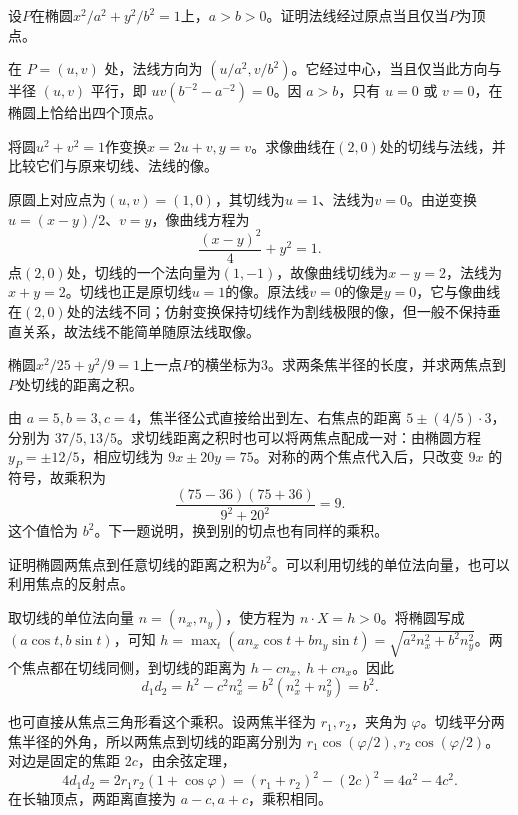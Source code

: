 设\(P\)在椭圆\(x^2/a^2+y^2/b^2=1\)上，\(a>b>0\)。证明法线经过原点当且仅当\(P\)为顶点。
\par
\solutionanswer
在 \(P=(u,v)\) 处，法线方向为 \((u/a^2,v/b^2)\)。它经过中心，当且仅当此方向与半径 \((u,v)\) 平行，即 \(uv(b^{-2}-a^{-2})=0\)。因 \(a>b\)，只有 \(u=0\) 或 \(v=0\)，在椭圆上恰给出四个顶点。


将圆\(u^2+v^2=1\)作变换\(x=2u+v,y=v\)。求像曲线在\((2,0)\)处的切线与法线，并比较它们与原来切线、法线的像。
\par
\solutionanswer
原圆上对应点为\((u,v)=(1,0)\)，其切线为\(u=1\)、法线为\(v=0\)。由逆变换\(u=(x-y)/2\)、\(v=y\)，像曲线方程为
\[
\frac{(x-y)^2}{4}+y^2=1.
\]
点\((2,0)\)处，切线的一个法向量为\((1,-1)\)，故像曲线切线为\(x-y=2\)，法线为\(x+y=2\)。切线也正是原切线\(u=1\)的像。原法线\(v=0\)的像是\(y=0\)，它与像曲线在\((2,0)\)处的法线不同；仿射变换保持切线作为割线极限的像，但一般不保持垂直关系，故法线不能简单随原法线取像。


椭圆\(x^2/25+y^2/9=1\)上一点\(P\)的横坐标为\(3\)。求两条焦半径的长度，并求两焦点到\(P\)处切线的距离之积。
\par
\solutionanswer
由 \(a=5,b=3,c=4\)，焦半径公式直接给出到左、右焦点的距离 \(5\pm(4/5)\cdot3\)，分别为 \(37/5,13/5\)。求切线距离之积时也可以将两焦点配成一对：由椭圆方程 \(y_P=\pm12/5\)，相应切线为 \(9x\pm20y=75\)。对称的两个焦点代入后，只改变 \(9x\) 的符号，故乘积为
\[
 \frac{(75-36)(75+36)}{9^2+20^2}=9.
\]
这个值恰为 \(b^2\)。下一题说明，换到别的切点也有同样的乘积。


证明椭圆两焦点到任意切线的距离之积为\(b^2\)。可以利用切线的单位法向量，也可以利用焦点的反射点。
\par
\solutionanswer
取切线的单位法向量 \(n=(n_x,n_y)\)，使方程为 \(n\cdot X=h>0\)。将椭圆写成 \((a\cos t,b\sin t)\)，可知 \(h=\max_t(an_x\cos t+bn_y\sin t)=\sqrt{a^2n_x^2+b^2n_y^2}\)。两个焦点都在切线同侧，到切线的距离为 \(h-cn_x,\ h+cn_x\)。因此
\[
 d_1d_2=h^2-c^2n_x^2=b^2(n_x^2+n_y^2)=b^2.
\]

也可直接从焦点三角形看这个乘积。设两焦半径为 \(r_1,r_2\)，夹角为 \(\varphi\)。切线平分两焦半径的外角，所以两焦点到切线的距离分别为 \(r_1\cos(\varphi/2),r_2\cos(\varphi/2)\)。对边是固定的焦距 \(2c\)，由余弦定理，
\[
 4d_1d_2=2r_1r_2(1+\cos\varphi)=(r_1+r_2)^2-(2c)^2=4a^2-4c^2.
\]
在长轴顶点，两距离直接为 \(a-c,a+c\)，乘积相同。


